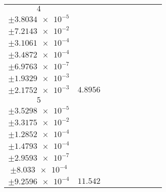 \documentclass[8pt]{article}
\begin{document}
\begin{longtable}[l]{c c c c c c c c c}
$\num{4}$ & \begin{tabular}[c]{@{}c@{}}$\num{3.0468e-2}$ \\ $\pm\num{3.8034e-5}$\end{tabular} & \begin{tabular}[c]{@{}c@{}}$\num{-1.0508e-2}$ \\ $\pm\num{7.2143e-2}$\end{tabular} & \begin{tabular}[c]{@{}c@{}}$\num{1.9092}$ \\ $\pm\num{3.1061e-4}$\end{tabular} & \begin{tabular}[c]{@{}c@{}}$\num{639.59}$ \\ $\pm\num{3.4872e-4}$\end{tabular} & \begin{tabular}[c]{@{}c@{}}$\num{1.2795}$ \\ $\pm\num{6.9763e-7}$\end{tabular} & \begin{tabular}[c]{@{}c@{}}$\num{1.3375}$ \\ $\pm\num{1.9329e-3}$\end{tabular} & \begin{tabular}[c]{@{}c@{}}$\num{1.3368}$ \\ $\pm\num{2.1752e-3}$\end{tabular} & $\num{4.8956}$\\
$\num{5}$ & \begin{tabular}[c]{@{}c@{}}$\num{6.1414e-2}$ \\ $\pm\num{3.5298e-5}$\end{tabular} & \begin{tabular}[c]{@{}c@{}}$\num{0.54413}$ \\ $\pm\num{3.3175e-2}$\end{tabular} & \begin{tabular}[c]{@{}c@{}}$\num{5.2056}$ \\ $\pm\num{1.2852e-4}$\end{tabular} & \begin{tabular}[c]{@{}c@{}}$\num{642.89}$ \\ $\pm\num{1.4793e-4}$\end{tabular} & \begin{tabular}[c]{@{}c@{}}$\num{1.2861}$ \\ $\pm\num{2.9593e-7}$\end{tabular} & \begin{tabular}[c]{@{}c@{}}$\num{1.2049}$ \\ $\pm\num{8.033e-4}$\end{tabular} & \begin{tabular}[c]{@{}c@{}}$\num{1.2019}$ \\ $\pm\num{9.2596e-4}$\end{tabular} & $\num{11.542}$\\

\end{longtable}
\end{document}
